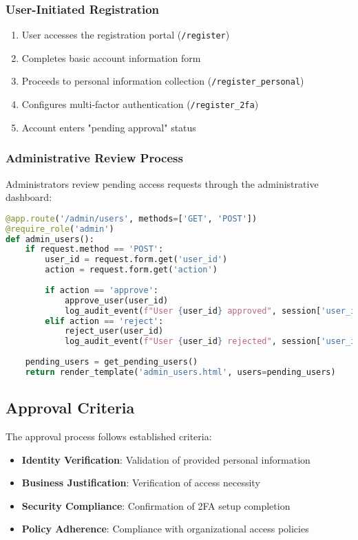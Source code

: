 \documentclass[12pt,a4paper]{article}
\begin{document}
\subsubsection{User-Initiated Registration}
\begin{enumerate}
    \item User accesses the registration portal (\texttt{/register})
    \item Completes basic account information form
    \item Proceeds to personal information collection (\texttt{/register\_personal})
    \item Configures multi-factor authentication (\texttt{/register\_2fa})
    \item Account enters "pending approval" status
\end{enumerate}

\subsubsection{Administrative Review Process}
Administrators review pending access requests through the administrative dashboard:

\begin{lstlisting}[language=Python, caption=Administrative Approval Process]
@app.route('/admin/users', methods=['GET', 'POST'])
@require_role('admin')
def admin_users():
    if request.method == 'POST':
        user_id = request.form.get('user_id')
        action = request.form.get('action')
        
        if action == 'approve':
            approve_user(user_id)
            log_audit_event(f"User {user_id} approved", session['user_id'])
        elif action == 'reject':
            reject_user(user_id)
            log_audit_event(f"User {user_id} rejected", session['user_id'])
    
    pending_users = get_pending_users()
    return render_template('admin_users.html', users=pending_users)
\end{lstlisting}

\subsection{Approval Criteria}
The approval process follows established criteria:

\begin{itemize}
    \item \textbf{Identity Verification}: Validation of provided personal information
    \item \textbf{Business Justification}: Verification of access necessity
    \item \textbf{Security Compliance}: Confirmation of 2FA setup completion
    \item \textbf{Policy Adherence}: Compliance with organizational access policies
\end{itemize}
\end{document}
